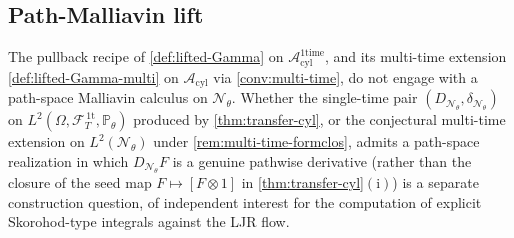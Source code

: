 \documentclass[11pt,reqno]{amsart}
\theoremstyle{plain}
\theoremstyle{definition}
\theoremstyle{remark}
\newcommand{\Prob}{\mathbb P}
\newcommand{\cA}{\mathcal A}
\newcommand{\cF}{\mathcal F}
\newcommand{\cN}{\mathcal N}
\newcommand{\Acyl}{\cA_{\mathrm{cyl}}}
\newcommand{\Aone}{\cA_{\mathrm{cyl}}^{\mathrm{1time}}}
\newcommand{\FT}{\cF_{T}^{\,\mathrm{1t}}}
\newcommand{\Hone}{L^{2}(\Omega,\FT,\Pth)}
\newcommand{\DN}{D_{\cN_{\theta}}}
\newcommand{\divN}{\delta_{\cN_{\theta}}}
\newcommand{\Pth}{\Prob_{\theta}}
\begin{document}
\subsection{Path-Malliavin lift}\label{sec:open-path-Malliavin}

The pullback recipe of \cref{def:lifted-Gamma} on $\Aone$, and its
multi-time extension \cref{def:lifted-Gamma-multi} on $\Acyl$ via
\cref{conv:multi-time}, do not engage with a path-space Malliavin
calculus on $\cN_{\theta}$. Whether the single-time pair
$(\DN,\divN)$ on $\Hone$ produced by \cref{thm:transfer-cyl}, or
the conjectural multi-time extension on $L^{2}(\cN_{\theta})$ under
\cref{rem:multi-time-formclos}, admits a path-space realization in
which $\DN F$ is a genuine pathwise derivative (rather than the
closure of the seed map $F\mapsto[F\otimes 1]$ in
\cref{thm:transfer-cyl}$(\mathrm i)$) is a separate construction
question, of independent interest for the computation of explicit
Skorohod-type integrals against the LJR flow.
\end{document}
